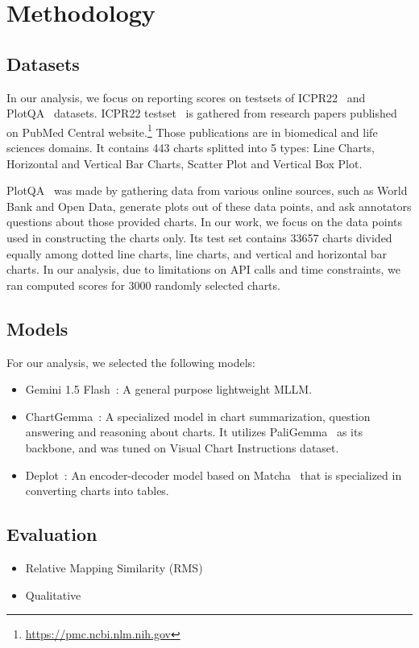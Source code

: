 \documentclass[
	letterpaper, %
]{jdf}
\begin{document}
\section{Methodology}\label{sect:methodology}
\subsection{Datasets}
In our analysis, we focus on reporting scores on testsets of ICPR22~\cite{rousseau2023pattern} and PlotQA~\cite{methani2020plotqa} datasets.
ICPR22 testset~\cite{rousseau2023pattern} is gathered from research papers published on PubMed Central website.\footnote{\href{https://pmc.ncbi.nlm.nih.gov}{https://pmc.ncbi.nlm.nih.gov}}
Those publications are in biomedical and life sciences domains.
It contains 443 charts splitted into 5 types: Line Charts, Horizontal and Vertical Bar Charts, Scatter Plot and Vertical Box Plot.

PlotQA~\cite{methani2020plotqa} was made by gathering data from various online sources, such as World Bank and Open Data, generate plots out of these data points, and ask annotators questions about those provided charts.
In our work, we focus on the data points used in constructing the charts only.
Its test set contains 33657 charts divided equally among dotted line charts, line charts, and vertical and horizontal bar charts.
In our analysis, due to limitations on API calls and time constraints, we ran computed scores for 3000 randomly selected charts.

\subsection{Models}\label{ssect:models}
For our analysis, we selected the following models:
\begin{itemize}
    \item Gemini 1.5 Flash~\cite{team2024gemini}: A general purpose lightweight MLLM.
         \item ChartGemma~\cite{masry2024chartgemma}: A specialized model in chart summarization, question answering and reasoning about charts.
             It utilizes PaliGemma~\cite{beyer2024paligemma} as its backbone, and was tuned on Visual Chart Instructions dataset.
         \item Deplot~\cite{liu2022deplot}: An encoder-decoder model based on Matcha~\cite{liu2022matcha} that is specialized in converting charts into tables.
              \end{itemize}
\subsection{Evaluation}
\begin{itemize}
    \item Relative Mapping Similarity (RMS)
    \item Qualitative
              \end{itemize}
\end{document}
